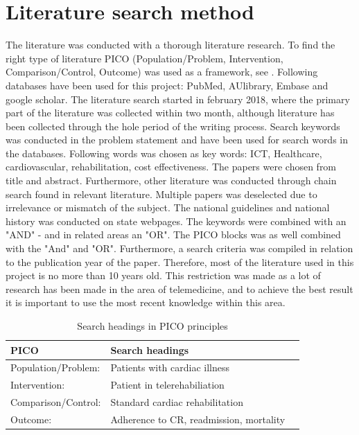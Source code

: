 \section{Literature search method}
\label{literature}

The literature was conducted with a thorough literature research. To find the right type of literature PICO (Population/Problem, Intervention, Comparison/Control, Outcome) was used as a framework, see  \cite{pico}. 
Following databases have been used for this project: PubMed,  AUlibrary, Embase and google scholar.
The literature search started in february 2018, where the primary part of the literature was collected within two month, although literature has been collected through the hole period of the writing process. 
Search keywords was conducted in the problem statement and have been used for search words in the databases. Following words was chosen as key words: ICT, Healthcare, cardiovascular, rehabilitation, cost effectiveness.
The papers were chosen from title and abstract. Furthermore, other literature was conducted through chain search found in relevant literature. Multiple papers was deselected due to irrelevance or mismatch of the subject. The national guidelines and national history was conducted on state webpages. The keywords were combined with an "AND" - and in related areas an "OR". The PICO blocks was as well combined with the "And" and "OR". Furthermore, a search criteria was compiled in relation to the publication year of the paper.  Therefore, most of the literature used in this project is no more than 10 years old. This restriction was made as a lot of research has been made in the area of telemedicine, and to achieve the best result it is important to use the most recent knowledge within this area. 

\begin{table}[H]
\begin{longtabu} to 
    \textbf{PICO} &        \textbf{Search headings} \\[-1ex]
    \midrule
     Population/Problem:   &    Patients with cardiac illness \\ \hline
    Intervention:   &        Patient in telerehabiliation \\ \hline
    Comparison/Control:    &        Standard cardiac rehabilitation \\ \hline
    Outcome:    &        Adherence to CR, readmission, mortality 
    \newline
   \end{longtabu}
\caption{Search headings in PICO principles \cite{pico}}
\label{PICO}
\end{table}



